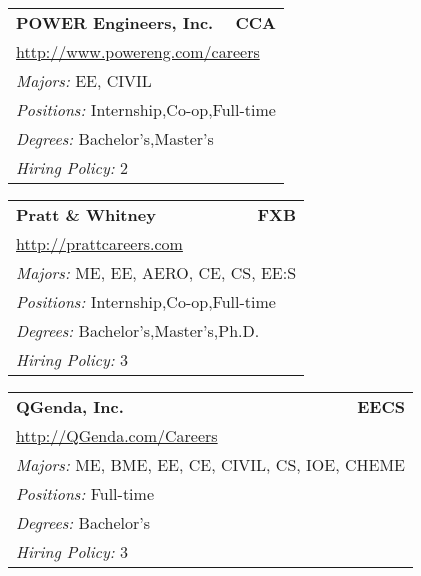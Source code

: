 \documentclass[twoside]{article}
\begin{document}
\begin{center}
\begin{multicols}{3}
\begin{FlushLeft}
\begin{minipage}{\columnwidth}
\end{minipage}
 
\begin{minipage}{\columnwidth}\begin{tabularx}{.95\columnwidth}{Xr}
                 {\Large\bf POWER Engineers, Inc.} & {\Large\bf CCA}\\
    \multicolumn{2}{p{.95\columnwidth}}{\url{http://www.powereng.com/careers}}\\
    \multicolumn{2}{p{.95\columnwidth}}{\emph{Majors:} EE, CIVIL}\\
    \multicolumn{2}{p{.95\columnwidth}}{\emph{Positions:} Internship,Co-op,Full-time}\\
    \multicolumn{2}{p{.95\columnwidth}}{\emph{Degrees:} Bachelor's,Master's}\\
    \multicolumn{2}{p{.95\columnwidth}}{\emph{Hiring Policy:} 2}\\
    \end{tabularx}
    
\end{minipage}
 
\begin{minipage}{\columnwidth}\begin{tabularx}{.95\columnwidth}{Xr}
                 {\Large\bf Pratt \& Whitney} & {\Large\bf FXB}\\
    \multicolumn{2}{p{.95\columnwidth}}{\url{http://prattcareers.com}}\\
    \multicolumn{2}{p{.95\columnwidth}}{\emph{Majors:} ME, EE, AERO, CE, CS, EE:S}\\
    \multicolumn{2}{p{.95\columnwidth}}{\emph{Positions:} Internship,Co-op,Full-time}\\
    \multicolumn{2}{p{.95\columnwidth}}{\emph{Degrees:} Bachelor's,Master's,Ph.D.}\\
    \multicolumn{2}{p{.95\columnwidth}}{\emph{Hiring Policy:} 3}\\
    \end{tabularx}
    
\end{minipage}
 
\begin{minipage}{\columnwidth}\begin{tabularx}{.95\columnwidth}{Xr}
                 {\Large\bf QGenda, Inc.} & {\Large\bf EECS}\\
    \multicolumn{2}{p{.95\columnwidth}}{\url{http://QGenda.com/Careers}}\\
    \multicolumn{2}{p{.95\columnwidth}}{\emph{Majors:} ME, BME, EE, CE, CIVIL, CS, IOE, CHEME}\\
    \multicolumn{2}{p{.95\columnwidth}}{\emph{Positions:} Full-time}\\
    \multicolumn{2}{p{.95\columnwidth}}{\emph{Degrees:} Bachelor's}\\
    \multicolumn{2}{p{.95\columnwidth}}{\emph{Hiring Policy:} 3}\\
    \end{tabularx}
    

\end{minipage}
\end{FlushLeft}
\end{multicols}
\end{center}
\end{document}
